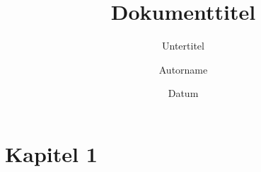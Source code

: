 \documentclass[ngerman]{scrartcl}
\title[Kurzform]{Dokumenttitel}
\subtitle{Untertitel}
\date{Datum}
\author{Autorname}
\begin{document}
 \maketitle

 \tableofcontents
 \cleardoublepage

 \section{Kapitel 1}
 \label{sec:kap1}

 \lipsum[1-15]
\end{document}
